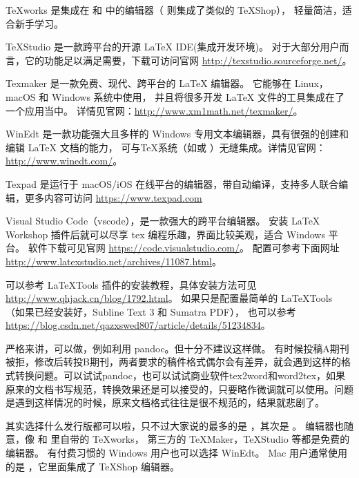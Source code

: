 TeXworks 是集成在 \TeXLive{} 和 \MiKTeX{} 中的编辑器（\MacTeX{} 则集成了类似的 TeXShop），
轻量简洁，适合新手学习。

TeXStudio 是一款跨平台的开源 \LaTeX{} IDE(集成开发环境)。
对于大部分用户而言，它的功能足以满足需要，下载可访问官网 \url{http://texstudio.sourceforge.net/}。

Texmaker 是一款免费、现代、跨平台的 \LaTeX{} 编辑器。 它能够在 Linux，macOS 和 Windows 系统中使用，
并且将很多开发 \LaTeX{} 文件的工具集成在了一个应用当中。
详情见官网：\url{http://www.xm1math.net/texmaker/}。

WinEdt 是一款功能强大且多样的 Windows 专用文本编辑器，具有很强的创建和编辑 \LaTeX{} 文档的能力，
可与TeX系统（如\MiKTeX{}或 \TeXLive{}）无缝集成。详情见官网：\url{http://www.winedt.com/}。

Texpad 是运行于 macOS/iOS 在线平台的编辑器，带自动编译，支持多人联合编辑，更多内容可访问
\url{https://www.texpad.com}

Visual Studio Code（vscode），是一款强大的跨平台编辑器。
安装 LaTeX Workshop 插件后就可以尽享 tex 编程乐趣，界面比较美观，适合 Windows 平台。
软件下载可见官网 \url{https://code.visualstudio.com/}。
配置可参考下面网址 \url{http://www.latexstudio.net/archives/11087.html}。



可以参考 LaTeXTools 插件的安装教程，具体安装方法可见 \url{http://www.qhjack.cn/blog/1792.html}。
如果只是配置最简单的 LaTeXTools （如果已经安装好\TeXLive{}，Subline Text 3 和 Sumatra PDF），
也可以参考 \url{https://blog.csdn.net/qazxswed807/article/details/51234834}。



严格来讲，可以做，例如利用 pandoc。但十分不建议这样做。
有时候投稿A期刊被拒，修改后转投B期刊，两者要求的稿件格式偶尔会有差异，就会遇到这样的格式转换问题。可以试试pandoc，也可以试试商业软件tex2word和word2tex，如果原来的文档书写规范，转换效果还是可以接受的，只要略作微调就可以使用。问题是遇到这样情况的时候，原来文档格式往往是很不规范的，结果就悲剧了。



其实选择什么发行版都可以啦，只不过大家说的最多的是 \TeXLive{}，其次是 \MiKTeX{}。
编辑器也随意，像 \TeXLive{} 和 \MiKTeX{} 里自带的 TeXworks，
第三方的 TeXMaker，TeXStudio 等都是免费的编辑器。
有付费习惯的 Windows 用户也可以选择 WinEdt。
Mac 用户通常使用的是 \MacTeX{}，它里面集成了 TeXShop 编辑器。


